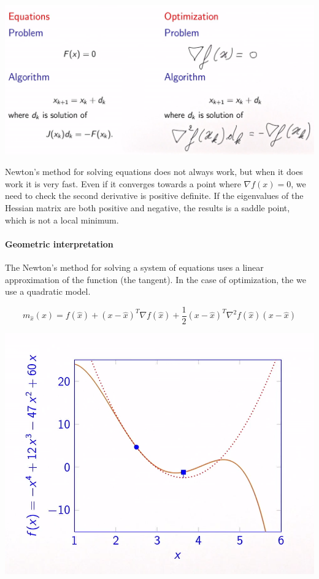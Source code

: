 \includegraphics[width=\linewidth]{content/Newton_optimization.png}

Newton's method for solving equations does not always work, but when it does work it is very fast.
Even if it converges towards a point where $\nabla f(x) = 0$, we need to check the second derivative is positive definite. If the eigenvalues of the Hessian matrix are both positive and negative, the results is a saddle point, which is not a local minimum.

\paragraph{Geometric interpretation}

The Newton's method for solving a system of equations uses a linear approximation of the function (the tangent). In the case of optimization, the we use a quadratic model.

\begin{equation}
    m_{\hat{x}}(x)=f(\hat{x}) + (x-\hat{x})^T \nabla f(\hat{x}) + \frac{1}{2}(x-\hat{x})^T \nabla^2 f(\hat{x}) (x-\hat{x})
\end{equation}

\includegraphics[width=\linewidth]{content/newton_quadratic_model.png}

